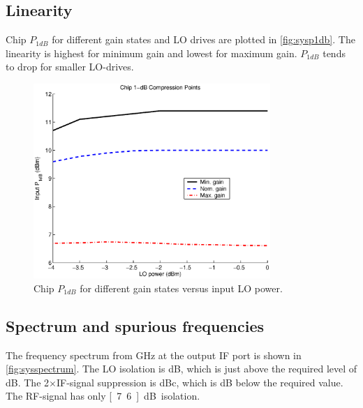 		\subsection{Linearity}
			Chip $P_{1dB}$ for different gain states and LO drives are plotted in \autoref{fig:sysp1db}. The linearity is highest for minimum gain and lowest for maximum gain. $P_{1dB}$ tends to drop for smaller LO-drives. 
			
			
			\begin{figure}[hbt!]
				\centering
				\includegraphics[width=0.8\textwidth]{fig/summary/chipp1db}
				\caption[Chip $P_{1dB}$.]{Chip $P_{1dB}$ for different gain states versus input LO power.}\label{fig:sysp1db}
			\end{figure}
			
		\subsection{Spectrum and spurious frequencies}
			The frequency spectrum from \unit[0 to 10]{GHz} at the output IF port is shown in \autoref{fig:sysspectrum}. The LO isolation is \unit[21]{dB}, which is just above the required level of \unit[20]{dB}. The 2$\times$IF-signal suppression is \unit[38]{dBc}, which is \unit[2]{dB} below the required value. The RF-signal has only \unit[7.6]{dB} isolation.
			
